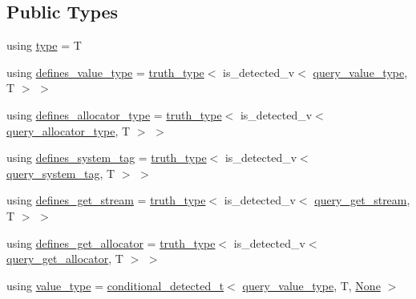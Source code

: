 \subsection*{Public Types}
\begin{DoxyCompactItemize}
\item 
using \hyperlink{structbc_1_1traits_1_1common__traits_ae7549f5bfa9a9b046fa6441cc27c1d2b}{type} = T
\item 
using \hyperlink{structbc_1_1traits_1_1common__traits_ab2572a37cb2db47047767e1d4ea2def0}{defines\+\_\+value\+\_\+type} = \hyperlink{namespacebc_1_1traits_ac91a9795000ae7f483efbaf74c9872e8}{truth\+\_\+type}$<$ is\+\_\+detected\+\_\+v$<$ \hyperlink{namespacebc_1_1traits_a40b9437a2ec1bb34ee7d506c8053f906}{query\+\_\+value\+\_\+type}, T $>$ $>$
\item 
using \hyperlink{structbc_1_1traits_1_1common__traits_a34ec53adbbda52eb2f30cb3ea1e07aac}{defines\+\_\+allocator\+\_\+type} = \hyperlink{namespacebc_1_1traits_ac91a9795000ae7f483efbaf74c9872e8}{truth\+\_\+type}$<$ is\+\_\+detected\+\_\+v$<$ \hyperlink{namespacebc_1_1traits_ab141f0cc8348b4b7ebcb48e6bbb50d09}{query\+\_\+allocator\+\_\+type}, T $>$ $>$
\item 
using \hyperlink{structbc_1_1traits_1_1common__traits_a4d07315e9b67c49aa0d8271645975616}{defines\+\_\+system\+\_\+tag} = \hyperlink{namespacebc_1_1traits_ac91a9795000ae7f483efbaf74c9872e8}{truth\+\_\+type}$<$ is\+\_\+detected\+\_\+v$<$ \hyperlink{namespacebc_1_1traits_acfa34d40f06d5122586d7adefdfeb42f}{query\+\_\+system\+\_\+tag}, T $>$ $>$
\item 
using \hyperlink{structbc_1_1traits_1_1common__traits_a4446bc2c0010c6a2a4062fff4970a7e1}{defines\+\_\+get\+\_\+stream} = \hyperlink{namespacebc_1_1traits_ac91a9795000ae7f483efbaf74c9872e8}{truth\+\_\+type}$<$ is\+\_\+detected\+\_\+v$<$ \hyperlink{namespacebc_1_1traits_ae56dfced2583c1fbec104bcbdc2f1b44}{query\+\_\+get\+\_\+stream}, T $>$ $>$
\item 
using \hyperlink{structbc_1_1traits_1_1common__traits_a411e56449816c80e601cd7b0a177d274}{defines\+\_\+get\+\_\+allocator} = \hyperlink{namespacebc_1_1traits_ac91a9795000ae7f483efbaf74c9872e8}{truth\+\_\+type}$<$ is\+\_\+detected\+\_\+v$<$ \hyperlink{namespacebc_1_1traits_a7843a6596fe24415ac9e5eb4d804726a}{query\+\_\+get\+\_\+allocator}, T $>$ $>$
\item 
using \hyperlink{structbc_1_1traits_1_1common__traits_aa9c4393dd536fe43e9b5c09fc02c534b}{value\+\_\+type} = \hyperlink{namespacebc_1_1traits_a1a6d378947ec32acd457890854bcd592}{conditional\+\_\+detected\+\_\+t}$<$ \hyperlink{namespacebc_1_1traits_a40b9437a2ec1bb34ee7d506c8053f906}{query\+\_\+value\+\_\+type}, T, \hyperlink{classbc_1_1traits_1_1None}{None} $>$

\end{DoxyCompactItemize}
